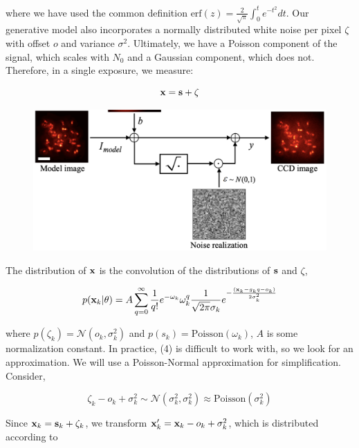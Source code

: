 \documentclass{article}
\begin{document}
where we have used the common definition $\mathrm{erf}(z) = \frac{2}{\sqrt{\pi}}\int_{0}^{t}e^{-t^{2}}dt$. Our generative model also incorporates a normally distributed white noise per pixel $\zeta$ with offset $o$ and variance $\sigma^{2}$. Ultimately, we have a Poisson component of the signal, which scales with $N_{0}$ and a Gaussian component, which does not. Therefore, in a single exposure, we measure: 

\begin{equation}
\bold{x} = \bold{s} + \bold{\zeta}
\end{equation}


\begin{figure}
\includegraphics[scale=0.5]{Generation.png}
\end{figure}

The distribution of $\bold{x}$ is the convolution of the distributions of $\bold{s}$ and $\zeta$,

\begin{equation}
p(\bold{x}_{k}|\theta) = A\sum_{q=0}^{\infty} \frac{1}{q!}e^{-\omega_{k}}\omega_{k}^{q}\frac{1}{\sqrt{2\pi}\sigma_{k}}e^{-\frac{(\bold{x}_{k}-g_{k}q-o_{k})}{2\sigma_{k}^{2}}}
\end{equation}

where $p(\zeta_{k}) = \mathcal{N}(o_{k},\sigma_{k}^{2})$ and $p(s_{k}) = \mathrm{Poisson}(\omega_{k})$,  $A$ is some normalization constant. In practice, (4) is difficult to work with, so we look for an approximation. We will use a Poisson-Normal approximation for simplification. Consider,

\begin{equation}
\zeta_{k} - o_{k} + \sigma_{k}^{2} \sim \mathcal{N}(\sigma_{k}^{2},\sigma_{k}^{2}) \approx \mathrm{Poisson}(\sigma_{k}^{2})
\end{equation}

Since $\bold{x}_{k} = \bold{s}_{k} + \zeta_{k}$, we transform $\bold{x}_{k}' = \bold{x}_{k} - o_{k} + \sigma_{k}^{2}$, which is distributed according to 
\end{document}
